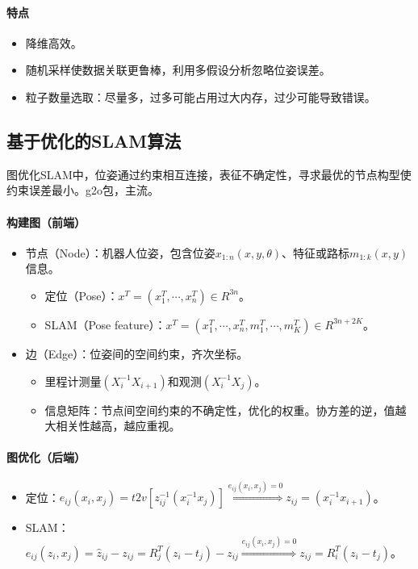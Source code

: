 \documentclass[
12pt, %
a4paper, 
oneside, %
headinclude,footinclude, %
]{scrartcl}
\begin{document}
\paragraph{特点}
\begin{itemize}
\item 降维高效。
\item 随机采样使数据关联更鲁棒，利用多假设分析忽略位姿误差。
\item 粒子数量选取：尽量多，过多可能占用过大内存，过少可能导致错误。
\end{itemize}
\subsection[基于优化的SLAM算法]{基于优化的SLAM算法}
图优化SLAM中，位姿通过约束相互连接，表征不确定性，寻求最优的节点构型使约束误差最小。g2o包，主流。
\paragraph{构建图（前端）}
\begin{itemize}
\item 节点（Node）：机器人位姿，包含位姿$ x_{1:n}(x, y ,\theta) $、特征或路标$ m_{1:k}(x, y) $信息。
\begin{itemize}
\item 定位（Pose）：$ x^T = (x_1^T, \cdots, x_n^T) \in R^{3n} $。
\item SLAM（Pose feature）：$ x^T = (x_1^T, \cdots, x_n^T, m_1^T, \cdots, m_K^T) \in R^{3n + 2K} $。
\end{itemize}
\item 边（Edge）：位姿间的空间约束，齐次坐标。
\begin{itemize}
\item 里程计测量$ (X_i^{-1}X_{i + 1}) $和观测$ (X_i^{-1}X_j) $。
\item 信息矩阵：节点间空间约束的不确定性，优化的权重。协方差的逆，值越大相关性越高，越应重视。
\end{itemize}
\end{itemize}
\paragraph{图优化（后端）}
\begin{itemize}
\item 定位：$ e_{ij}(x_i, x_j) = t2v[z_{ij}^{-1}(x_i^{-1}x_j)] \overset{e_{ij}(x_i, x_j) = 0}{\Longrightarrow} z_{ij} = (x_i^{-1}x_{i + 1}) $。
\item SLAM：$ e_{ij}(z_i, x_j) = \hat{z}_{ij} - z_{ij} = R_j^T(z_i - t_j) - z_{ij} \overset{e_{ij}(x_i, x_j) = 0}{\Longrightarrow} z_{ij} = R_i^T(z_i - t_j) $。
\end{itemize}
\end{document}
